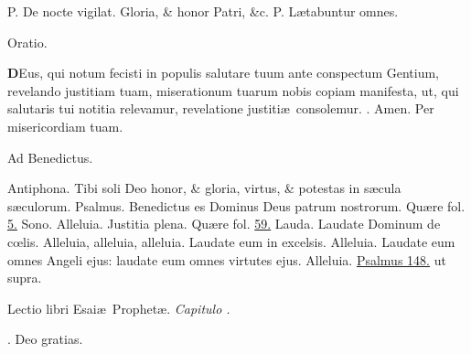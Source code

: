 \documentclass[letter,11pt]{book}
\makeatletter
\DeclareRobustCommand{\Rbar}{\vers@resp{0pt}{R}}
\newcommand{\vers@resp@sym}{\raisebox{0.2ex}{\rotatebox[origin=c]{-20}{$\m@th\rceil$}}}
\newcommand{\vers@resp}[2]{%
  {\ooalign{\hidewidth\kern#1\vers@resp@sym\hidewidth\cr#2\cr}}%
}%
\def\P{\color{Red} P. \color{black}}
\def\R{\color{Red} \Rbar . \color{black}}
\makeatother
\begin{document}
\begin{multicols*}{2}
\newline \P De nocte vigilat. Gloria, \& honor Patri, \&c. \P L\ae tabuntur omnes.
\vspace{-.5em} \begin{center} \color{Red} Oratio. \color{black} \end{center} \vspace{-.5em}
\lettrine[lines=2]{\bfseries \color{Red} D}{}Eus, qui notum fecisti in populis salutare tuum ante conspectum Gentium, revelando justitiam tuam, miserationum tuarum nobis copiam manifesta, ut, qui salutaris tui notitia relevamur, revelatione justiti\ae \ consolemur. \R Amen. Per misericordiam tuam.
\vspace{-.5em} \begin{center} \color{Red} Ad Benedictus. \color{black} \end{center} \vspace{-.5em}
\par \noindent \color{Red} Antiphona. \color{black} Tibi soli Deo honor, \& gloria, virtus, \& potestas in s\ae cula s\ae culorum.
\newline \color{Red} Psalmus. \color{black} Benedictus es Dominus Deus patrum nostrorum. \color{Red} Qu\ae re fol. \color{black} \hyperlink{benedictus}{5.}
\newline \color{Red} Sono. \color{black} Alleluia. Justitia plena. \color{Red} Qu\ae re fol. \color{black} \hyperlink{page.59}{59.}
\newline \color{Red} Lauda. \color{black} Laudate Dominum de c\oe lis. Alleluia, alleluia, alleluia. Laudate eum in
excelsis. Alleluia. Laudate eum omnes Angeli ejus: laudate eum omnes virtutes ejus. Alleluia. \color{Red} \hyperlink{ps148}{Psalmus 148.} ut supra. \color{black}
\vspace{-.5em} \begin{center} {\color{Red} L}ectio libri Esai\ae \ Prophet\ae . \itshape Capitulo . \color{black} \end{center} \vspace{-.5em}
\par \noindent \R Deo gratias.

\end{multicols*}
\end{document}
